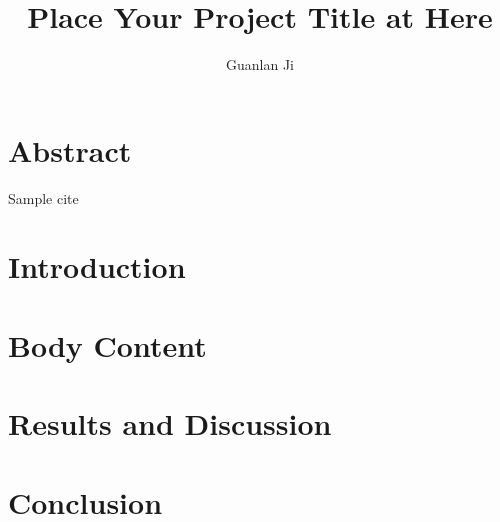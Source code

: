 \documentclass[12pt]{article}
\title{Place Your Project Title at Here}
\author{\textup{Guanlan Ji}}
\begin{document}

\tableofcontents
\newpage

\section{Abstract}
Sample cite \autocite{farokhzad2009impact} %

\section{Introduction}

\section{Body Content}

\section{Results and Discussion}

\section{Conclusion}

\printbibliography %
\end{document}
